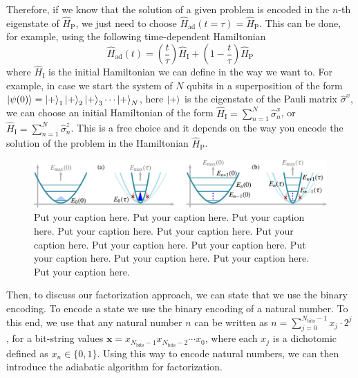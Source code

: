 Therefore, if we know that the solution of a given problem is encoded in the $n$-th eigenstate of $\hat{H}_{\mathrm{P}}$, we just need to choose $\hat{H}_{\mathrm{ad}}(t = \tau) = \hat{H}_{\mathrm{P}}$. This can be done, for example, using the following time-dependent Hamiltonian
\begin{equation}
	\hat{H}_{\mathrm{ad}}(t) = \left(\frac{t}{\tau}\right) \hat{H}_{\mathrm{I}} + \left(1 - \frac{t}{\tau}\right) \hat{H}_{\mathrm{P}} 
\end{equation}
where $\hat{H}_{\mathrm{I}}$ is the initial Hamiltonian we can define in the way we want to. For example, in case we start the system of $N$ qubits in a superposition of the form $\ket{\psi(0)} = \ket{+}_{1}\ket{+}_{2}\ket{+}_{3}\cdots \ket{+}_{N}$, here $\ket{+}$ is the eigenstate of the Pauli matrix $\hat{\sigma}^{x}$, we can choose an initial Hamiltonian of the form $\hat{H}_{\mathrm{I}} = \sum_{n=1}^{N} \hat{\sigma}^{x}_{n}$, or $\hat{H}_{\mathrm{I}} = \sum_{n=1}^{N} \hat{\sigma}^{z}_{n}$. This is a free choice and it depends on the way you encode the solution of the problem in the Hamiltonian $\hat{H}_{\mathrm{P}}$. 

\begin{figure}[t!]
	\includegraphics[width=\linewidth]{figs/drawing.pdf}
	\caption{Put your caption here. Put your caption here. Put your caption here. Put your caption here. Put your caption here. Put your caption here. Put your caption here. Put your caption here. Put your caption here. Put your caption here. Put your caption here. Put your caption here.}
	\label{Fig:label}
\end{figure}

Then, to discuss our factorization approach, we can state that we use the binary encoding. To encode a state we use the binary encoding of a natural number. To this end, we use that any natural number $n$ can be written as $n=\sum_{j=0}^{N_\mathrm{bits}-1} x_j \cdot 2^{j}$, for a bit-string values $\textbf{x} = x_{N_\mathrm{bits}-1} x_{N_\mathrm{bits}-2}  \cdots x_{0}$, where each $x_j$ is a dichotomic defined as $x_n \in \{0,1\}$. Using this way to encode natural numbers, we can then introduce the adiabatic algorithm for factorization.

